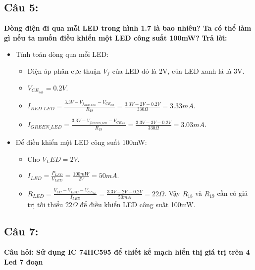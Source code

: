 \subsection{Câu 5:}
 \textbf{Dòng điện đi qua mỗi LED trong hình 1.7 là bao nhiêu? Ta có thể làm gì nếu ta muốn điều khiển một LED công suất 100mW?}
\textbf{Trả lời:}
\begin{itemize}
    \item Tính toán dòng qua mỗi LED:
    \begin{itemize}
        \item Điện áp phân cực thuận $V_f$ của LED đỏ là 2V, của LED xanh lá là 3V.
        \item $V_{CE_{sat}} = 0.2V$.
        \item $I_{RED\_LED} = \frac{3.3V - V_{f_{RED\_LED}} - V_{CE_{Sat}}}{R_{18}} = \frac{3.3V - 2V - 0.2V}{330\Omega} = 3.33mA$.
        \item $I_{GREEN\_LED} = \frac{3.3V - V_{f_{GREEN\_LED}} - V_{CE_{Sat}}}{R_{19}} = \frac{3.3V - 3V - 0.2V}{330\Omega} = 3.03mA$.
    \end{itemize}
    \item Để điều khiển một LED công suất 100mW:
    \begin{itemize}
        \item Cho $V_LED = 2V$.
        \item $I_{LED} = \frac{P_{LED}}{V_{LED}} = \frac{100mW}{2V} = 50mA$.
        \item $R_{LED} = \frac{V_{CC} - V_{LED} - V_{CE_{Sat}}}{I_{LED}} = \frac{3.3V - 2V - 0.2V}{50mA} = 22\Omega$.
        Vậy $R_{18}$ và $R_{19}$ cần có giả trị tối thiểu $22\Omega$ để điều khiển LED công suất 100mW.
    \end{itemize}
\end{itemize}
\subsection{Câu 7:}
\textbf{Câu hỏi: Sử dụng IC 74HC595 để thiết kế mạch hiển thị giá trị trên 4 Led 7 đoạn}
